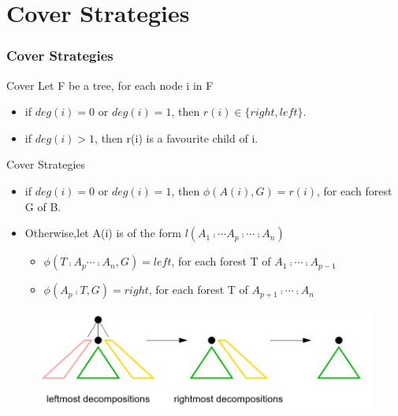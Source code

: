 \documentclass{beamer}
\begin{document}
\section{Cover Strategies}
\begin{frame}
\frametitle{Cover Strategies}
\begin{block}{Cover}
Let F be a tree, for each node i in F
\begin{itemize}
\item if $deg(i) = 0$ or $deg(i) = 1$, then $r(i) \in \{right, left\}$.
\item if $deg(i) > 1$, then r(i) is a favourite child of i.
\end{itemize}
\end{block}
\begin{block}{Cover Strategies}
\begin{itemize}
\item if $deg(i) = 0$ or $deg(i) = 1$, then $\phi(A(i), G) = r(i)$, for each forest G of B.
\item Otherwise,let A(i) is of the form $l(A_1 \comp \cdots A_p \comp \cdots \comp A_n)$
\begin{itemize}
\item $\phi(T \comp A_p \cdots \comp A_n, G) = left$, for each forest T of $A_1 \comp \cdots \comp A_{p-1}$
\item $\phi(A_p \comp T, G) = right$, for each forest T of $A_{p+1} \comp \cdots \comp A_n$
\end{itemize}
\end{itemize}
\end{block}
\begin{figure}
	\includegraphics[width=0.55\linewidth]{favouritechild}
	\label{Favourite Child} 
	\centering
\end{figure}
\end{frame}
\end{document}
